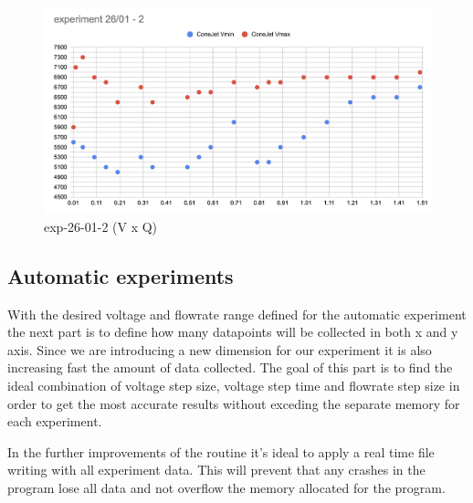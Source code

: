     \begin{figure}[H]
        \center
        \includegraphics[width=12cm]{Figuras/report3/exp26-01-2.png}
        \caption{ exp-26-01-2 (V x Q)}
    \end{figure}


\subsection{Automatic experiments}

With the desired voltage and flowrate range defined for the automatic experiment the next part is to define how many datapoints will be collected in both
x and y axis. Since we are introducing a new dimension for our experiment it is also increasing fast the amount of data collected.
The goal of this part is to find the ideal combination of voltage step size, voltage step time and flowrate step size in order to get the most accurate results without exceding the separate memory for each experiment.

In the further improvements of the routine it's ideal to apply a real time file writing with all experiment data.
This will prevent that any crashes in the program lose all data and not overflow the memory allocated for the program.


